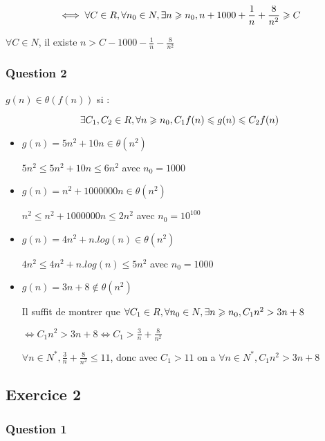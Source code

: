 \[
\iff \forall C \in \\R, \forall n_0 \in N, \exists n \geqslant n_0, n + 1000 + \frac{1}{n} + \frac{8}{n^2} \geqslant C
\]

$\forall C \in N$, il existe $n > C - 1000 - \frac{1}{n} - \frac{8}{n^2}$

\hypertarget{question-2}{%
\subsubsection{Question 2}\label{question-2}}

\(g(n) \in \theta(f(n))\) si :

\[
\exists C_1, C_2 \in \\R, \forall n \geqslant n_0, C_1f(n) \leqslant g(n) \leqslant C_2f(n)
\]

\begin{itemize}
\item
  \(g(n) = 5n^2 + 10n \in \theta(n^2)\)

  \(5n^2 \leqslant 5n^2 + 10n \leqslant 6n^2\) avec \(n_0 = 1000\)
\item
  \(g(n) = n^2 + 1000000n \in \theta(n^2)\)

  \(n^2 \leqslant n^2 + 1000000n \leqslant 2n^2\) avec
  \(n_0 = 10^{100}\)
\item
  \(g(n) = 4n^2 + n.log(n) \in \theta(n^2)\)

  \(4n^2 \leqslant 4n^2 + n.log(n) \leqslant 5n^2\) avec \(n_0 = 1000\)
\item
  \(g(n) = 3n+8 \notin \theta(n^2)\)

  Il suffit de montrer que
  \(\forall C_1\in\\R, \forall n_0 \in N, \exists n \geqslant n_0, C_1n^2 > 3n+8\)

  \(\iff C_1n^2>3n+8 \iff C_1 > \frac{3}{n} + \frac{8}{n^2}\)

  \(\forall n \in N^*, \frac{3}{n}+\frac{8}{n^2} \leqslant 11\), donc
  avec \(C_1 > 11\) on a \(\forall n \in N^*, C_1n^2 > 3n+8\)
\end{itemize}

\hypertarget{exercice-2}{%
\subsection{Exercice 2}\label{exercice-2}}

\hypertarget{question-1-1}{%
\subsubsection{Question 1}\label{question-1-1}}

